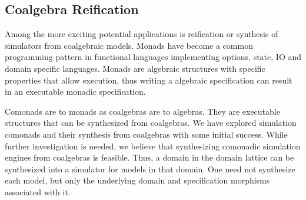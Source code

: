\documentclass[12pt]{article}
\begin{document}
\subsection{Coalgebra Reification}

Among the more exciting potential applications is reification or synthesis of simulators
from coalgebraic models.  Monads have become a common programming pattern in functional
languages implementing options, state, IO and domain specific languages.  Monads are
algebraic structures with specific properties that allow execution, thus writing a
algebraic specification can result in an executable monadic specification.

Comonads are to monads as coalgebras are to algebras.  They are executable structures that
can be synthesized from coalgebras.  We have explored simulation comonads and their
synthesis from coalgebras with some initial success.  While further investigation is
needed, we believe that synthesizing comonadic simulation engines from coalgebras is
feasible.  Thus, a domain in the domain lattice can be synthesized into a simulator for
models in that domain.  One need not synthesize each model, but only the underlying domain
and specification morphisms associated with it.


\end{document}
